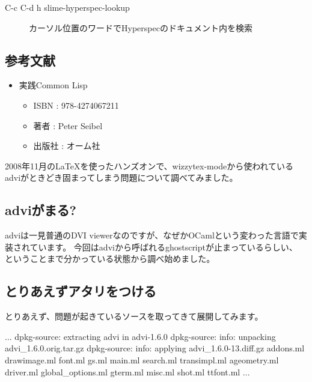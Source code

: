 \documentclass[mingoth,a4paper]{jsarticle}
\begin{document}
\begin{description}
\item[C-c C-d h  slime-hyperspec-lookup]     カーソル位置のワードでHyperspecのドキュメント内を検索
\end{description}

\subsection{参考文献}

\begin{itemize}
\item 実践Common Lisp

\begin{itemize}
\item ISBN : 978-4274067211
\item 著者 : Peter Seibel
\item 出版社 : オーム社
\end{itemize}

\end{itemize}


2008年11月のLaTeXを使ったハンズオンで、wizzytex-modeから使われている
adviがときどき固まってしまう問題について調べてみました。

\subsection{adviがまる?}

adviは一見普通のDVI viewerなのですが、なぜかOCamlという変わった言語で実装されています。
今回はadviから呼ばれるghostscriptが止まっているらしい、
ということまで分かっている状態から調べ始めました。

\subsection{とりあえずアタリをつける}

とりあえず、問題が起きているソースを取ってきて展開してみます。

\begin{commandline}
...
dpkg-source: extracting advi in advi-1.6.0
dpkg-source: info: unpacking advi_1.6.0.orig.tar.gz
dpkg-source: info: applying advi_1.6.0-13.diff.gz
addons.ml     drawimage.ml  font.ml            gs.ml             main.ml     search.ml      transimpl.ml
ageometry.ml  driver.ml     global_options.ml  gterm.ml          misc.ml     shot.ml        ttfont.ml
...
\end{commandline}
\end{document}
